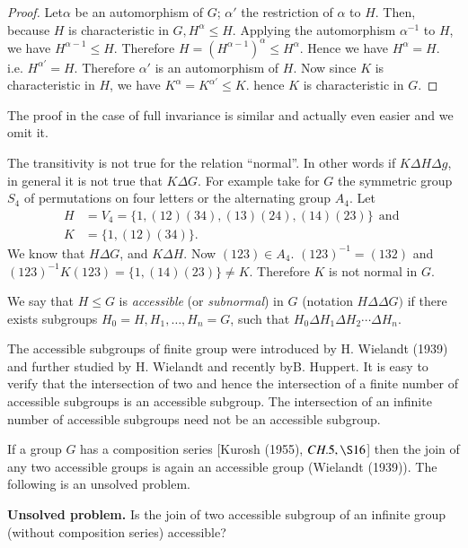 \begin{proof}
  Let\pageoriginale $\alpha$ be an automorphism of $G$; $\alpha'$ the restriction
  of $\alpha$ to $H$. Then, because $H$ is characteristic in $G, H^\alpha \leq
  H$. Applying the automorphism $\alpha^{-1}$ to $H$, we have
  $H^{\alpha-1} \leq H$. Therefore $H=(H^{\alpha-1})^\alpha \leq
  H^\alpha$. Hence we have $H^\alpha = H$. i.e. $H^{\alpha'}=H$. Therefore
  $\alpha'$ is an automorphism of $H$. Now since $K$ is characteristic
  in $H$, we have $K^\alpha = K^{\alpha'} \leq K$. hence $K$ is
  characteristic in $G$. 
\end{proof} 
 
The proof in the case of full invariance is similar and actually even
easier and we omit it. 
 
The transitivity is not true for the relation ``normal''. In other words
if $K \Delta H \Delta g$, in general it is not true that $K \Delta
G$. For example take for $G$ the symmetric group $S_4$ of permutations
on four letters or the alternating group $A_4$. Let 
\begin{align*}
  H & = V_4 = \bigg\{ 1, (12)(34), (13)(24), (14)(23)\bigg \} ~~\text{
    and } \\ 
  K & = \bigg \{1, (12) (34)\bigg \}.
\end{align*} 
 We know that $H \Delta G$, and $K \Delta H$. Now $(123) \in 
 A_4$. $(123)^{-1} = (132)$ and $(123)^{-1}K(123) = \bigg \{1, (14)
 (23)\bigg \} \neq K$. Therefore $K$ is not normal in $G$.
 
We say that $H \leq G$ is \textit{accessible} (or \textit{subnormal})
in $G$ (notation $H \Delta \Delta G)$ if there exists subgroups $H_0 =
H, H_1,\ldots, H_n = G$, such that $H_0 \Delta H_1 \Delta H_2 \cdots
\Delta H_n $. 
 
The accessible subgroups of finite group were introduced by
H. Wielandt (1939) and further studied by H. Wielandt and recently
by\pageoriginale B. Huppert. It is easy to verify that the intersection of two and
hence the intersection of a finite number of accessible subgroups is
an accessible subgroup. The intersection of an infinite number of
accessible subgroups need not be an accessible subgroup. 
 
If a group $G$ has a composition series [Kurosh (1955), $CH. 5, \S
  16$] then the join of any two accessible groups is again an
accessible group (Wielandt (1939)). The following is an unsolved
problem. 
 
\noindent \textbf{Unsolved problem. }
  Is the join of two accessible subgroup of an infinite group (without
  composition series) accessible? 
 
